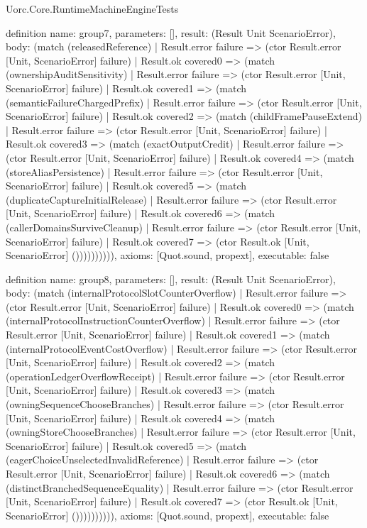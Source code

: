 \begin{lexlean}{Uorc.Core.RuntimeMachineEngineTests}
\begin{semanticmodule}
definition{
  name: group7,
  parameters: [],
  result: (Result Unit ScenarioError),
  body: (match (releasedReference)
    | Result.error failure => (ctor Result.error [Unit, ScenarioError] failure)
    | Result.ok covered0 => (match (ownershipAuditSensitivity)
      | Result.error failure => (ctor Result.error [Unit, ScenarioError] failure)
      | Result.ok covered1 => (match (semanticFailureChargedPrefix)
        | Result.error failure => (ctor Result.error [Unit, ScenarioError] failure)
        | Result.ok covered2 => (match (childFramePauseExtend)
          | Result.error failure => (ctor Result.error [Unit, ScenarioError] failure)
          | Result.ok covered3 => (match (exactOutputCredit)
            | Result.error failure => (ctor Result.error [Unit, ScenarioError] failure)
            | Result.ok covered4 => (match (storeAliasPersistence)
              | Result.error failure => (ctor Result.error [Unit, ScenarioError] failure)
              | Result.ok covered5 => (match (duplicateCaptureInitialRelease)
                | Result.error failure => (ctor Result.error [Unit, ScenarioError] failure)
                | Result.ok covered6 => (match (callerDomainsSurviveCleanup)
                  | Result.error failure => (ctor Result.error [Unit, ScenarioError] failure)
                  | Result.ok covered7 => (ctor Result.ok [Unit, ScenarioError] ()))))))))),
  axioms: [Quot.sound, propext],
  executable: false
}

definition{
  name: group8,
  parameters: [],
  result: (Result Unit ScenarioError),
  body: (match (internalProtocolSlotCounterOverflow)
    | Result.error failure => (ctor Result.error [Unit, ScenarioError] failure)
    | Result.ok covered0 => (match (internalProtocolInstructionCounterOverflow)
      | Result.error failure => (ctor Result.error [Unit, ScenarioError] failure)
      | Result.ok covered1 => (match (internalProtocolEventCostOverflow)
        | Result.error failure => (ctor Result.error [Unit, ScenarioError] failure)
        | Result.ok covered2 => (match (operationLedgerOverflowReceipt)
          | Result.error failure => (ctor Result.error [Unit, ScenarioError] failure)
          | Result.ok covered3 => (match (owningSequenceChooseBranches)
            | Result.error failure => (ctor Result.error [Unit, ScenarioError] failure)
            | Result.ok covered4 => (match (owningStoreChooseBranches)
              | Result.error failure => (ctor Result.error [Unit, ScenarioError] failure)
              | Result.ok covered5 => (match (eagerChoiceUnselectedInvalidReference)
                | Result.error failure => (ctor Result.error [Unit, ScenarioError] failure)
                | Result.ok covered6 => (match (distinctBranchedSequenceEquality)
                  | Result.error failure => (ctor Result.error [Unit, ScenarioError] failure)
                  | Result.ok covered7 => (ctor Result.ok [Unit, ScenarioError] ()))))))))),
  axioms: [Quot.sound, propext],
  executable: false
}


\end{semanticmodule}
\end{lexlean}
